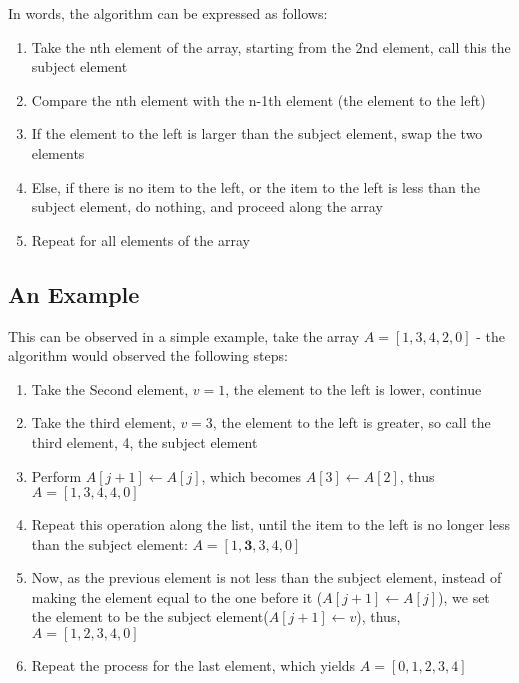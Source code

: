 \documentclass{article}
\begin{document}
        In words, the algorithm can be expressed as follows:
        \begin{enumerate}[itemsep=0mm]
            \item Take the nth element of the array, starting from the 2nd element, call this the subject element
            \item Compare the nth element with the n-1th element (the element to the left)
            \item If the element to the left is larger than the subject element, swap the two elements
            \item Else, if there is no item to the left, or the item to the left is less than the subject element, do nothing, and proceed along the array
            \item Repeat for all elements of the array
        \end{enumerate}

    \subsection{An Example}
        This can be observed in a simple example, take the array $A=[1, 3, 4, 2, 0]$ - the algorithm would observed the following steps:

        \begin{enumerate}[itemsep=0mm]
            \item Take the Second element, $v=1$, the element to the left is lower, continue
            \item Take the third element, $v=3$, the element to the left is greater, so call the third element, 4, the subject element
            \item Perform $A[j + 1] \leftarrow A[j]$, which becomes $A[3] \leftarrow A[2]$, thus $A=[1, 3, 4, 4, 0]$
            \item Repeat this operation along the list, until the item to the left is no longer less than the subject element: $A=[1, \mathbf{3}, 3, 4, 0]$
            \item Now, as the previous element is not less than the subject element, instead of making the element equal to the one before it ($A[j + 1] \leftarrow A[j]$), we set the element to be the subject element($A[j + 1] \leftarrow      v$), thus, $A=[1, 2, 3, 4, 0]$
            \item Repeat the process for the last element, which yields $A=[0, 1, 2, 3, 4]$
        \end{enumerate}
\end{document}
